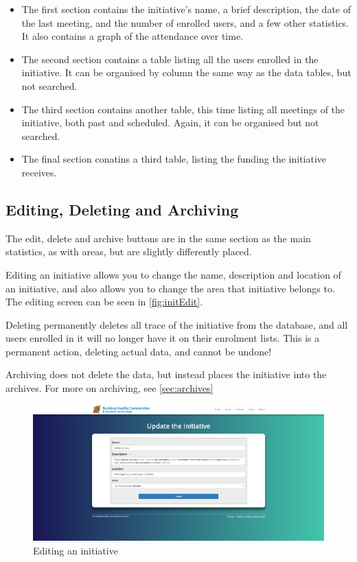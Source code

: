 \documentclass{bhcguides}
\begin{document}
\begin{itemize}
	\item The first section contains the initiative's name, a brief description, the date of the last meeting, and the number of enrolled users, and a few other statistics. It also contains a graph of the attendance over time.
	\item The second section contains a table listing all the users enrolled in the initiative. It can be organised by column the same way as the data tables, but not searched.
	\item The third section contains another table, this time listing all meetings of the initiative, both past and scheduled. Again, it can be organised but not searched.
	\item The final section conatins a third table, listing the funding the initiative receives.
\end{itemize}



\subsection{Editing, Deleting and Archiving}
\label{ssec:initeditdelete}

The edit, delete and archive buttons are in the same section as the main statistics, as with areas, but are slightly differently placed.

Editing an initiative allows you to change the name, description and location of an initiative, and also allows you to change the area that initiative belongs to. The editing screen can be seen in \autoref{fig:initEdit}.

Deleting permanently deletes all trace of the initiative from the database, and all users enrolled in it will no longer have it on their enrolment lists. This is a permanent action, deleting actual data, and cannot be undone!

Archiving does not delete the data, but instead places the initiative into the archives. For more on archiving, see \autoref{sec:archives}

\begin{figure}[h!]
 \centerline{\includegraphics[width=\textwidth, height=\textheight, keepaspectratio]{editinitiative.png}}
 \caption{Editing an initiative}
 \label{fig:initEdit}
\end{figure}
\end{document}
